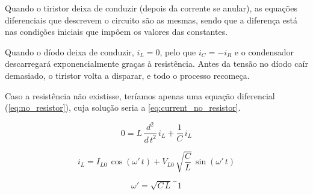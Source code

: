 \documentclass[a4paper,11pt]{article}
\numberwithin{equation}{section}
\begin{document}

Quando o tiristor deixa de conduzir (depois da corrente se anular), as equações diferenciais que descrevem o circuito são as mesmas, sendo que a diferença está nas condições iniciais que impõem os valores das constantes.

Quando o díodo deixa de conduzir, $i_L = 0$, pelo que $i_C = -i_R$ e o condensador descarregará exponencialmente graças à resistência. Antes da tensão no díodo caír demasiado, o tiristor volta a disparar, e todo o processo recomeça.

Caso a resistência não existisse, teríamos apenas uma equação diferencial (\autoref{eq:no_resistor}), cuja solução seria a \autoref{eq:current_no_resistor}.

\begin{equation}
\label{eq:no_resistor}
0 = L\,\frac{d^2}{d\,t^2}\,i_L + \frac{1}{C}\,i_L
\end{equation}

\begin{equation}
\label{eq:current_no_resistor}
i_L = I_{L0}\,\cos{(\omega'\,t)} + V_{L0}\,\sqrt{\frac{C}{L}}\,\sin{(\omega'\,t)}
\end{equation}

\begin{equation}
\omega'=\sqrt{C\,L}^-1
\end{equation}
\end{document}
